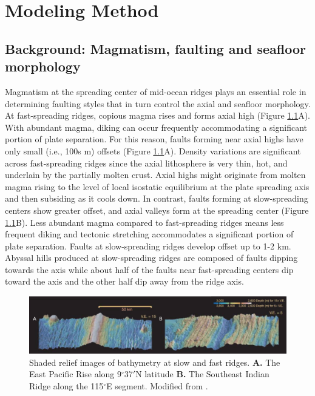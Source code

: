 \documentclass[letterpaper,12pt,notitle]{memphisthesis}                     %
\begin{document}
\chapter{Modeling Method}

\section{Background: Magmatism, faulting and seafloor morphology}
Magmatism at the spreading center of mid-ocean ridges plays an essential role in determining faulting styles that in turn control the axial and seafloor morphology. At fast-spreading ridges, copious magma rises and forms axial high (Figure \ref{fig:ridgebathymetry}A). With abundant magma, diking can occur frequently accommodating a significant portion of plate separation. For this reason, faults forming near axial highs have only small (i.e., 100s m) offsets (Figure \ref{fig:ridgebathymetry}A). Density variations are significant across fast-spreading ridges since the axial lithosphere is very thin, hot, and underlain by the partially molten crust. Axial highs might originate from molten magma rising to the level of local isostatic equilibrium at the plate spreading axis and then subsiding as it cools down. In contrast, faults forming at slow-spreading centers show greater offset, and axial valleys form at the spreading center (Figure \ref{fig:ridgebathymetry}B). Less abundant magma compared to fast-spreading ridges means less frequent diking and tectonic stretching accommodates a significant portion of plate separation. Faults at slow-spreading ridges develop offset up to 1-2 km. Abyssal hills produced at slow-spreading ridges are composed of faults dipping towards the axis while about half of the faults near fast-spreading centers dip toward the axis and the other half dip away from the ridge axis.

\begin{figure}[!htb]
	\centering
	\includegraphics[width=0.99\linewidth]{./figs/bathy_buck.png}
	\caption{Shaded relief images of bathymetry at slow and fast ridges. \textbf{A.} The East Pacific Rise along 9$^\circ$37$'$N latitude \textbf{B.} The Southeast Indian Ridge along the 115$^\circ$E segment. Modified from \citet{Buck2005}.}
	\label{fig:ridgebathymetry}
\end{figure}
\end{document}
